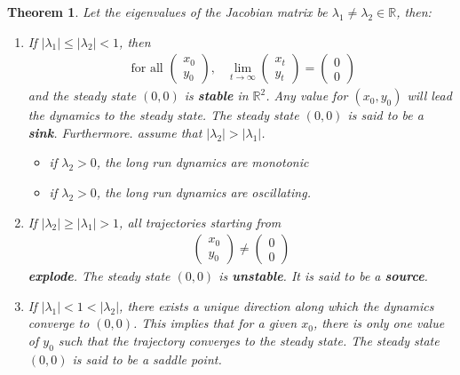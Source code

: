\documentclass[11pt,a4paper]{book}
\newtheorem{theorem}{Theorem}[section]
\theoremstyle{definition}\newtheorem{definition}{Definition}
\theoremstyle{definition}\newtheorem{fact}{Fact}
\theoremstyle{definition}\newtheorem{remark}{Remark}
\theoremstyle{definition}\newtheorem{ex}{Ex.}
\theoremstyle{definition}\newtheorem{project}{Project}
\theoremstyle{definition}\newtheorem{problem}{Problem}
\theoremstyle{definition}\newtheorem{example}{Example}
\newenvironment{ftheorem}
{\begin{mdframed}\begin{theorem}}
		{\end{theorem}\end{mdframed}}
\numberwithin{theorem}{section}
\numberwithin{corollary}{chapter}
\numberwithin{assumption}{chapter}
\numberwithin{definition}{chapter}
\numberwithin{prop}{chapter}
\numberwithin{notation}{chapter}
\numberwithin{problem}{chapter}
\numberwithin{example}{chapter}
\numberwithin{fact}{chapter}
\numberwithin{ex}{chapter}
\def\R{\mathbb R}
\def\R{\mathbb R}
\begin{document}
	\begin{ftheorem}
		Let the eigenvalues of the Jacobian matrix be $\lambda_1 \neq \lambda_2 \in \R$, then:
		\begin{enumerate}
			\item If $|\lambda_1| \leq |\lambda_2| < 1$, then
			\begin{align*}
				\text{ for all } 
				\begin{pmatrix}
						x_0 \\ y_0
				\end{pmatrix}, & \lim_{t\to\infty}  \begin{pmatrix}
				x_t \\ y_t
				\end{pmatrix} = 
				\begin{pmatrix}
				0 \\ 0
				\end{pmatrix}
			\end{align*}
			and the steady state $(0, 0)$ is \textbf{stable} in $\R^2$. Any value for $(x_0, y_0)$ will lead the
			dynamics to the steady state. The steady state $(0, 0)$ is said to be a \textbf{sink}. Furthermore. assume that $|\lambda_2| > |\lambda_1|$.
			\begin{itemize}
				\item if $\lambda_2 > 0$, the long run dynamics are monotonic
				\item if $\lambda_2 > 0$, the long run dynamics are oscillating.
			\end{itemize}
			\item If $|\lambda_2| \geq |\lambda_1| > 1$, all trajectories starting from
			\begin{align*}
				\begin{pmatrix}
					x_0 \\ y_0
				\end{pmatrix} \neq \begin{pmatrix}
				0 \\ 0
				\end{pmatrix}
			\end{align*}
			\textbf{explode}. The steady state $(0,0)$ is \textbf{unstable}. It is said to be a \textbf{source}.
			\item If $|\lambda_1| < 1 < |\lambda_2| $, there exists a unique direction along which the dynamics
			converge to $(0, 0)$. This implies that for a given $x_0$, there is only one value of $y_0$ such that the trajectory converges to the steady state. The steady state $(0, 0)$ is said to be a saddle point.
		\end{enumerate}
	\end{ftheorem}
	
\end{document}
